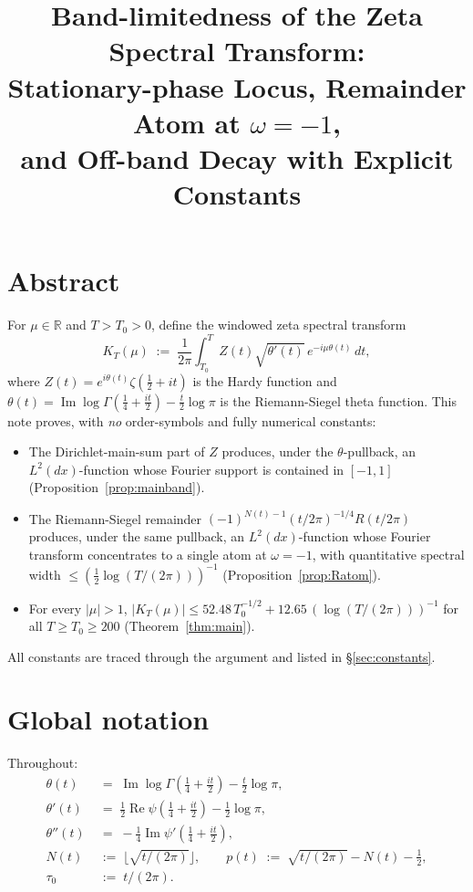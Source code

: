 \documentclass[11pt]{article}
\title{Band-limitedness of the Zeta Spectral Transform: \\
Stationary-phase Locus, Remainder Atom at $\omega=-1$, \\
and Off-band Decay with Explicit Constants}
\author{}
\date{}
\DeclareMathOperator{\ImOp}{Im}
\DeclareMathOperator{\ReOp}{Re}
\let\Im\ImOp
\let\Re\ReOp
\begin{document}
\maketitle

\section*{Abstract}

For $\mu\in\mathbb{R}$ and $T>T_{0}>0$, define the windowed zeta spectral transform
\[
  K_{T}(\mu) \;:=\; \frac{1}{2\pi}\int_{T_{0}}^{T} Z(t)\sqrt{\theta'(t)}\,e^{-i\mu\theta(t)}\,dt,
\]
where $Z(t) = e^{i\theta(t)}\zeta(\tfrac{1}{2}+it)$ is the Hardy function and $\theta(t) = \Im\log\Gamma(\tfrac14+\tfrac{it}{2}) - \tfrac{t}{2}\log\pi$ is the Riemann-Siegel theta function. This note proves, with \emph{no} order-symbols and fully numerical constants:

\begin{itemize}
  \item The Dirichlet-main-sum part of $Z$ produces, under the $\theta$-pullback, an $L^{2}(dx)$-function whose Fourier support is contained in $[-1,1]$ (Proposition~\ref{prop:mainband}).
  \item The Riemann-Siegel remainder $(-1)^{N(t)-1}(t/2\pi)^{-1/4}R(t/2\pi)$ produces, under the same pullback, an $L^{2}(dx)$-function whose Fourier transform concentrates to a single atom at $\omega=-1$, with quantitative spectral width $\le (\tfrac12\log(T/(2\pi)))^{-1}$ (Proposition~\ref{prop:Ratom}).
  \item For every $|\mu|>1$, $|K_{T}(\mu)| \le 52.48\,T_{0}^{-1/2} + 12.65\,(\log(T/(2\pi)))^{-1}$ for all $T\ge T_{0}\ge 200$ (Theorem~\ref{thm:main}).
\end{itemize}

All constants are traced through the argument and listed in \S\ref{sec:constants}.

\section{Global notation}

Throughout:
\begin{align}
  \theta(t) &\;=\; \Im\log\Gamma\!\left(\tfrac{1}{4}+\tfrac{it}{2}\right) - \tfrac{t}{2}\log\pi, \label{eq:theta} \\
  \theta'(t) &\;=\; \tfrac{1}{2}\Re\psi\!\left(\tfrac{1}{4}+\tfrac{it}{2}\right) - \tfrac{1}{2}\log\pi, \label{eq:thetap} \\
  \theta''(t) &\;=\; -\tfrac{1}{4}\Im\psi'\!\left(\tfrac{1}{4}+\tfrac{it}{2}\right), \label{eq:thetapp} \\
  N(t) &\;:=\; \lfloor\sqrt{t/(2\pi)}\rfloor, \qquad p(t) \;:=\; \sqrt{t/(2\pi)} - N(t) - \tfrac{1}{2}, \label{eq:Np} \\
  \tau_{0} &\;:=\; t/(2\pi). \nonumber
\end{align}
\end{document}
